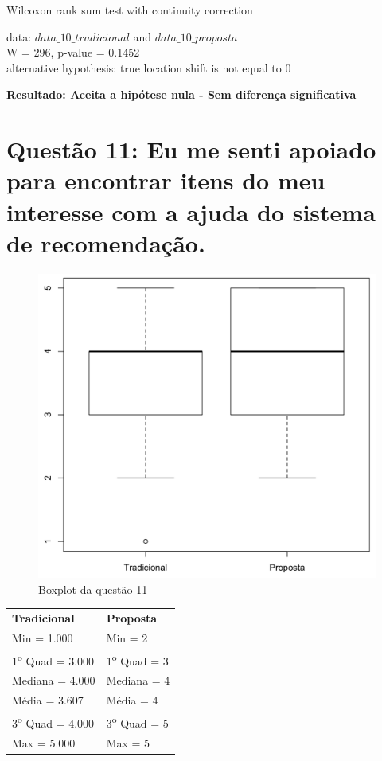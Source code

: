Wilcoxon rank sum test with continuity correction

\noindent
data:  $data\_10\_tradicional$ and $data\_10\_proposta$\\
W = 296, p-value = 0.1452\\
alternative hypothesis: true location shift is not equal to 0

\noindent
\textbf{Resultado: Aceita a hipótese nula - Sem diferença significativa}

\newpage
\section{Questão 11: Eu me senti apoiado para encontrar itens do meu interesse com a ajuda do sistema de recomendação.}

\begin{figure}[htb]
  \caption{\label{fig:questao11-boxplot}Boxplot da questão 11}
  \begin{center}
      \includegraphics[scale=0.4]{./Figuras/questao11-boxplot.png}
  \end{center}
\end{figure}

\begin{table}[h]
\begin{tabular}{p{}p{}}
\textbf{Tradicional} & \textbf{Proposta} \\
Min = 1.000 & Min = 2\\
1\textsuperscript{o} Quad = 3.000 & 1\textsuperscript{o} Quad = 3\\
Mediana = 4.000 & Mediana = 4\\
Média = 3.607 & Média = 4\\
3\textsuperscript{o} Quad = 4.000 & 3\textsuperscript{o} Quad = 5\\
Max = 5.000 & Max = 5\\
\end{tabular}
\end{table}

